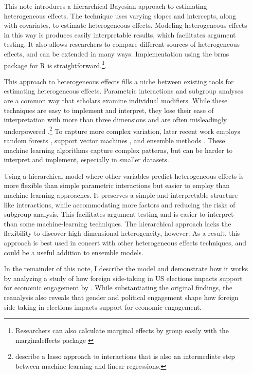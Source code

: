 \documentclass[12pt]{article}
\begin{document}
This note introduces a hierarchical Bayesian approach to estimating heterogeneous effects. 
The technique uses varying slopes and intercepts, along with covariates, to estimate heterogeneous effects. 
Modeling heterogeneous effects in this way is produces easily interpretable results, which facilitates argument testing. 
It also allows researchers to compare different sources of heterogeneous effects, and can be extended in many ways.  
Implementation using the brms package for \textsf{R} is straightforward.\footnote{Researchers can also calculate marginal effects by group easily with the marginaleffects package \citep{ArelBundockme}}. 


This approach to heterogeneous effects fills a niche between existing tools for estimating heterogeneous effects.
Parametric interactions and subgroup analyses are a common way that scholars examine individual modifiers. 
While these techniques are easy to implement and interpret, they lose their ease of interpretation with more than three dimensions and are often misleadingly underpowered \citep{Simmonsetal2011}.\footnote{\citet{BlackwellOlson2022} describe a lasso approach to interactions that is also an intermediate step between machine-learning and linear regressions.}
To capture more complex variation, later recent work employs random forests \citep{GreenKern2012, WagerAthey2018}, support vector machines \citep{ImaiRatkovic2013}, and ensemble methods \citep{Grimmeretal2017, Kuenzeletal2019, Dorieetal2022}.
These machine learning algorithms capture complex patterns, but can be harder to interpret and implement, especially in smaller datasets. 

 
 
Using a hierarchical model where other variables predict heterogeneous effects is more flexible than simple parametric interactions but easier to employ than machine learning approaches.  
It preserves a simple and interpretable structure like interactions, while accommodating more factors and reducing the risks of subgroup analysis. 
This facilitates argument testing and is easier to interpret than some machine-learning techniques.
The hierarchical approach lacks the flexibility to discover high-dimensional heterogeneity, however.  
As a result, this approach is best used in concert with other heterogeneous effects techniques, and could be a useful addition to ensemble models. 


In the remainder of this note, I describe the model and demonstrate how it works by analyzing a study of how foreign side-taking in US elections impacts support for economic engagement by \citet{BushPrather2020}.  
While substantiating the original findings, the reanalysis also reveals that gender and political engagement shape how foreign side-taking in elections impacts support for economic engagement.
\end{document}

